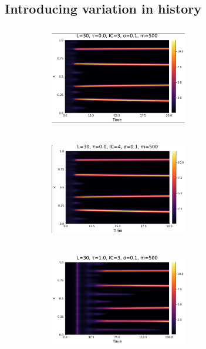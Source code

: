 \documentclass[12pt,a4paper]{article}
\begin{document}
\subsection{Introducing variation in history}


\begin{figure}[H]
    \begin{subfigure}[b]{0.45\linewidth}
        \centering
        \includegraphics[width=6cm,height = 4.5cm]{l30t0ic3s1e1.png}
        \caption{}
        \label{}
    \end{subfigure}
    \hfill
    \begin{subfigure}[b]{0.45\linewidth}
        \centering
        \includegraphics[width=6cm,height = 4.5cm]{l30t0ic4s1e1.png}
        \caption{}
        \label{}
    \end{subfigure}
    \newline
    \hfill
    \begin{subfigure}[b]{0.45\linewidth}
        \centering
        \includegraphics[width=6cm,height = 4.5cm]{l30t1ic3s1e1.png}
        \caption{}
        \label{}
    \end{subfigure}
    \hfill
    \begin{subfigure}[b]{0.45\linewidth}

\end{subfigure}
\end{figure}
\end{document}
